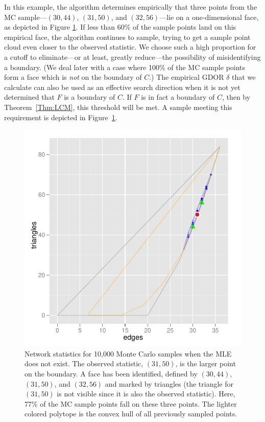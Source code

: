 In this example, the algorithm determines empirically that three points 
from the MC sample---$(30,44)$, $(31,50)$, and $(32,56)$---lie on a 
one-dimensional face, as depicted in Figure \ref{F:MC face}.  
If less than 60\% of the sample points land on this empirical face, the 
algorithm continues to sample, trying to get a sample point cloud even closer to the 
observed statistic.  We choose such a high proportion for a cutoff to eliminate---or 
at least, greatly reduce---the possibility of misidentifying a boundary.
(We deal later with a case where 100\% of the MC sample points form a face which is 
\emph{not} on the boundary of $C$.)  The empirical GDOR $\delta$ that we calculate 
can also be used as an effective search direction when it is not yet determined that 
$F$ is a boundary of $C$.  If $F$ is in fact a boundary of $C$, then 
by Theorem~\ref{Thm:LCM}, this threshold will be met.  A sample meeting this requirement 
is depicted in Figure~\ref{F:MC face}. 

\begin{figure}[h!]
\centering
\includegraphics[width=5in]{Figures/MCsample-77face}
\caption[Network statistics for 10,000 Monte Carlo samples when MLE does not exist]
{Network statistics for 10,000 Monte Carlo samples when the MLE does not exist.  
The observed statistic, $(31,50)$, is the larger point on the boundary.
A face has been identified,
defined by $(30,44)$, $(31,50)$, and $(32,56)$ and marked 
by triangles (the triangle for 
$(31,50)$ is not visible since it is also the observed statistic).  
Here, 77\% of the MC sample points fall on these three points.
The lighter colored polytope is the convex hull of all previously 
sampled points.
}
\label{F:MC face}
\end{figure}

